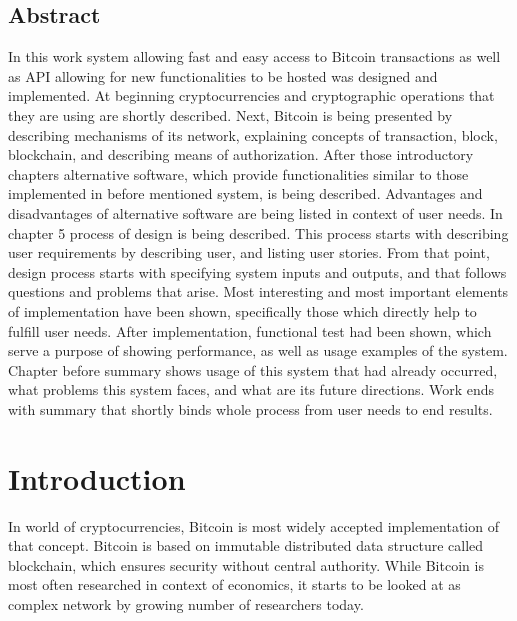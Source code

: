 \documentclass[12pt, en, eng, oneside, final]{mgr}
\begin{document}
\section*{Abstract}

In this work system allowing fast and easy access to Bitcoin transactions as well as API allowing for new functionalities to be hosted was designed and implemented. At beginning cryptocurrencies and cryptographic operations that they are using are shortly described. Next, Bitcoin is being presented by describing mechanisms of its network, explaining concepts of transaction, block, blockchain, and describing means of authorization. After those introductory chapters alternative software, which provide functionalities similar to those implemented in before mentioned system, is being described. Advantages and disadvantages of alternative software are being listed in context of user needs. In chapter 5 process of design is being described. This process starts with describing user requirements by describing user, and listing user stories. From that point, design process starts with specifying system inputs and outputs, and that follows questions and problems that arise. Most interesting and most important elements of implementation have been shown, specifically those which directly help to fulfill user needs. After implementation, functional test had been shown, which serve a purpose of showing performance, as well as usage examples of the system. Chapter before summary shows usage of this system that had already occurred, what problems this system faces, and what are its future directions. Work ends with summary that shortly binds whole process from user needs to end results.

\chapter{Introduction}

In world of cryptocurrencies, Bitcoin is most widely accepted implementation of that concept. Bitcoin is based on immutable distributed data structure called blockchain, which ensures security without central authority. While Bitcoin is most often researched in context of economics, it starts to be looked at as complex network by growing number of researchers today. 
\end{document}
